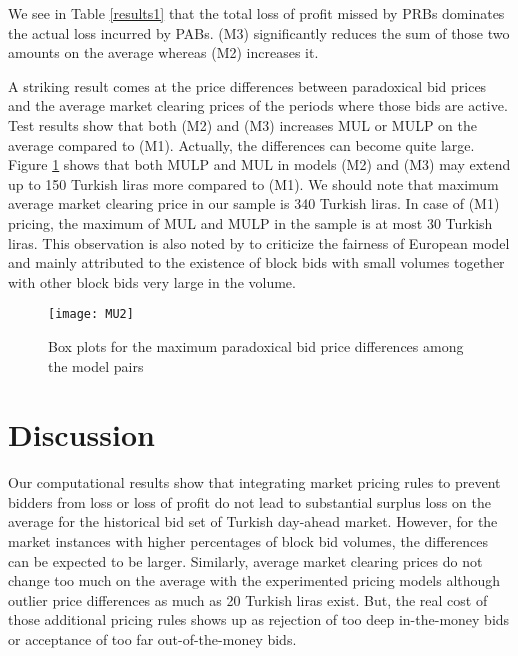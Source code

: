 \documentclass[conference]{IEEEtran}
\begin{document}

We see in Table \ref{results1} that the total loss of profit missed by PRBs dominates the actual loss incurred by PABs. (M3) significantly reduces the sum of those two amounts on the average whereas (M2) increases it.


A striking result comes at the price differences between paradoxical bid prices and the average market clearing prices of the periods where those bids are active. Test results show that both (M2) and (M3) increases MUL or MULP on the average compared to (M1). Actually, the differences can become quite large. Figure \ref{f5} shows that both MULP and MUL in models (M2) and (M3) may extend up to 150 Turkish liras more compared to (M1). We should note that maximum average market clearing price in our sample is 340 Turkish liras. In case of (M1) pricing, the maximum of MUL and MULP in the sample is at most 30 Turkish liras. This observation is also noted by \cite{van2011linear} to criticize the fairness of European model and mainly attributed to the existence of block bids with small volumes together with other block bids very large in the volume.

\begin{figure}[ht!]
\begin{center}
\texttt{[image: MU2]}
\caption{Box plots for the maximum paradoxical bid price differences among the model pairs} 
\label{f5}
\end{center}
\end{figure}

\section{Discussion}
\label{disc}
Our computational results show that integrating market pricing rules to prevent bidders from loss or loss of profit do not lead to substantial surplus loss on the average for the historical bid set of Turkish day-ahead market. However, for the market instances with higher percentages of block bid volumes, the differences can be expected to be larger. Similarly, average market clearing prices do not change too much on the average with the experimented pricing models although outlier price differences as much as 20 Turkish liras exist. But, the real cost of those additional pricing rules shows up as rejection of too deep in-the-money bids or acceptance of too far out-of-the-money bids. 
\end{document}
